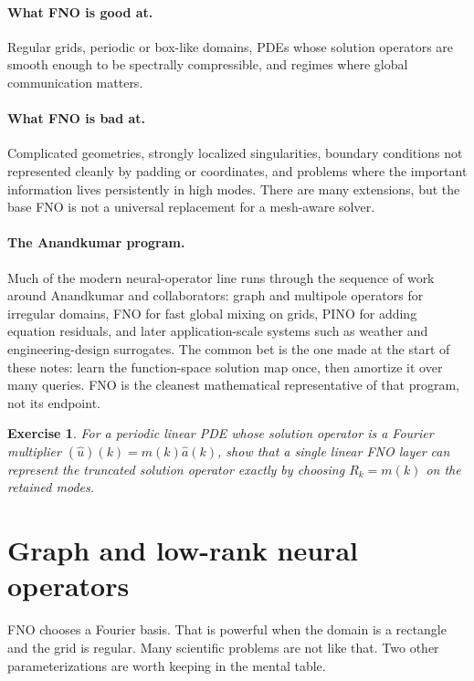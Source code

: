 \documentclass[10pt,a4paper]{article}
\newtheorem{exercise}{Exercise}
\begin{document}
\paragraph{What FNO is good at.}
Regular grids, periodic or box-like domains, PDEs whose solution operators
are smooth enough to be spectrally compressible, and regimes where global
communication matters.

\paragraph{What FNO is bad at.}
Complicated geometries, strongly localized singularities, boundary conditions
not represented cleanly by padding or coordinates, and problems where the
important information lives persistently in high modes. There are many
extensions, but the base FNO is not a universal replacement for a mesh-aware
solver.

\paragraph{The Anandkumar program.}
Much of the modern neural-operator line runs through the sequence of work
around Anandkumar and collaborators: graph and multipole operators for
irregular domains, FNO for fast global mixing on grids, PINO for adding
equation residuals, and later application-scale systems such as weather and
engineering-design surrogates. The common bet is the one made at the start of
these notes: learn the function-space solution map once, then amortize it over
many queries. FNO is the cleanest mathematical representative of that program,
not its endpoint.

\begin{exercise}
For a periodic linear PDE whose solution operator is a Fourier multiplier
$(\widehat{u})(k) = m(k)\widehat{a}(k)$, show that a single linear FNO layer
can represent the truncated solution operator exactly by choosing
$R_k = m(k)$ on the retained modes.
\end{exercise}

\section{Graph and low-rank neural operators}
\label{sec:graph-lowrank}

FNO chooses a Fourier basis. That is powerful when the domain is a rectangle
and the grid is regular. Many scientific problems are not like that. Two
other parameterizations are worth keeping in the mental table.
\end{document}
